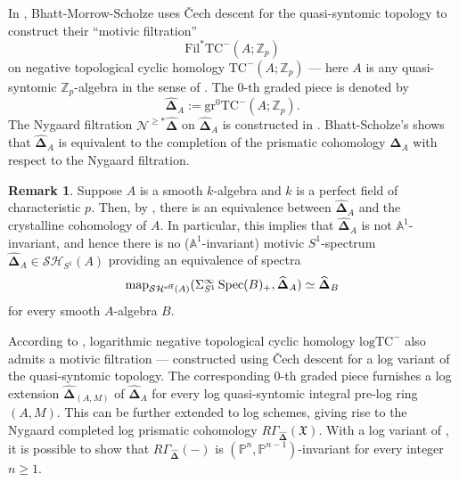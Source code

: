 \documentclass[11pt, a4paper]{amsart}
\theoremstyle{definition}
\newtheorem{rmk}[thm]{Remark}
\numberwithin{equation}{subsection}
\newcommand{\Z}{\mathbb{Z}}
\renewcommand{\P}{\mathbb{P}}
\newcommand{\A}{\mathbb{A}}
\providecommand{\Spec}[1]{\operatorname{Spec}(#1)} 	%
\newcommand{\TC}{\mathrm{TC}}
\newcommand{\logTC}{\mathrm{logTC}}
\newcommand{\cN}{\mathcal{N}}
\newcommand{\eff}{{\rm eff}}
\newcommand{\infSH}{\mathcal{SH}}
\newcommand{\infSHS}{\mathcal{SH}^{\eff}}
\newcommand{\map}{\operatorname{map}}
\begin{document}
In \cite[Theorem 1.12(2)]{BMS19}, 
Bhatt-Morrow-Scholze uses \v{C}ech descent for the quasi-syntomic topology to construct their 
``motivic filtration''
\[
\mathrm{Fil}^\ast \TC^-(A;\Z_p)
\]
on negative topological cyclic homology $\TC^-(A;\Z_p)$ 
--- here $A$ is any quasi-syntomic $\Z_p$-algebra in the sense of \cite[Definition 4.10]{BMS19}. 
The $0$-th graded piece is denoted by
\[
\widehat{\mathbf{\Delta}}_A
:=
\mathrm{gr}^0\TC^-(A;\Z_p).
\]
The Nygaard filtration $\cN^{\geq \ast}\widehat{\mathbf{\Delta}}$ on $\widehat{\mathbf{\Delta}}_A$ is constructed 
in \cite[Theorem 7.2(2)]{BMS19}.
Bhatt-Scholze's \cite[Theorem 13.1]{BS22} shows that $\widehat{\mathbf{\Delta}}_A$ is equivalent to the 
completion of the prismatic cohomology $\mathbf{\Delta}_A$ with respect to the Nygaard filtration.
\begin{rmk}
Suppose $A$ is a smooth $k$-algebra and $k$ is a perfect field of characteristic $p$.
Then, by \cite[Theorem 1.10]{BMS19}, 
there is an equivalence between  $\widehat{\mathbf{\Delta}}_A$ and the crystalline cohomology of $A$.
In particular, 
this implies that $\widehat{\mathbf{\Delta}}_A$ is not $\A^1$-invariant, 
and hence there is no ($\mathbb{A}^1$-invariant) motivic $S^1$-spectrum $\widehat{\mathbf{\Delta}}_A\in \infSH_{S^1}(A)$ 
providing an equivalence of spectra
\[
\map_{\infSHS(A)}
(
\Sigma_{S^1}^\infty \Spec{B}_+,\widehat{\mathbf{\Delta}}_A
)
\simeq
\widehat{\mathbf{\Delta}}_B
\]
for every smooth $A$-algebra $B$.
\end{rmk}
According to \cite{BLPO2},
logarithmic negative topological cyclic homology 
$\logTC^-$ also admits a motivic filtration --- 
constructed using \v{C}ech descent for a log variant of the quasi-syntomic topology.
The corresponding $0$-th graded piece furnishes a log extension $\widehat{\mathbf{\Delta}}_{(A,M)}$ 
of $\widehat{\mathbf{\Delta}}_{A}$ for every log quasi-syntomic integral pre-log ring $(A,M)$.
This can be further extended to log schemes, giving rise to the Nygaard completed log prismatic cohomology $R\Gamma_{\widehat{\mathbf{\Delta}}}(\mathfrak{X})$.
With a log variant of \cite[Proposition 7.8]{BMS19},
it is possible to show that $R\Gamma_{\widehat{\mathbf{\Delta}}}(-)$ is 
$(\P^n,\P^{n-1})$-invariant for every integer $n\geq 1$.
\end{document}
